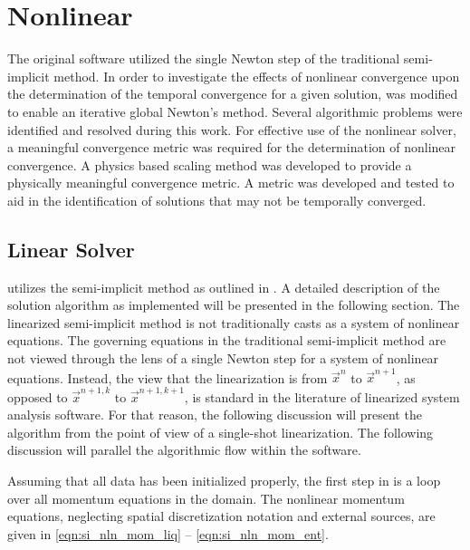 \chapter{Nonlinear \cobra{}}
\label{chap:nln_solver}
The original \cobra{} software utilized the single Newton step of the traditional semi-implicit method.
In order to investigate the effects of nonlinear convergence upon the determination of the temporal convergence for a given solution, \cobra{} was modified to enable an iterative global Newton's method.
Several algorithmic problems were identified and resolved during this work.
For effective use of the nonlinear solver, a meaningful convergence metric was required for the determination of nonlinear convergence.
A physics based scaling method was developed to provide a physically meaningful convergence metric.
A metric was developed and tested to aid in the identification of solutions that may not be temporally converged.

\section{Linear Solver}
\label{sect:linCobraAlg}

\cobra{} utilizes the semi-implicit method as outlined in .
A detailed description of the solution algorithm as implemented will be presented in the following section.
The linearized semi-implicit method is not traditionally casts as a system of nonlinear equations.
The governing equations in the traditional semi-implicit method are not viewed through the lens of a single Newton step for a system of nonlinear equations.
Instead, the view that the linearization is from $\vec{x}^{n}$ to $\vec{x}^{n+1}$, as opposed to $\vec{x}^{n+1, k}$ to $\vec{x}^{n+1, k+1}$, is standard in the literature of linearized system analysis software.
For that reason, the following discussion will present the algorithm from the point of view of a single-shot linearization.
The following discussion will parallel the algorithmic flow within the \cobra{} software.

Assuming that all data has been initialized properly, the first step in \cobra{} is a loop over all momentum equations in the domain.
The nonlinear momentum equations, neglecting spatial discretization notation and external sources, are given in \eqref{eqn:si_nln_mom_liq} -- \eqref{eqn:si_nln_mom_ent}.

